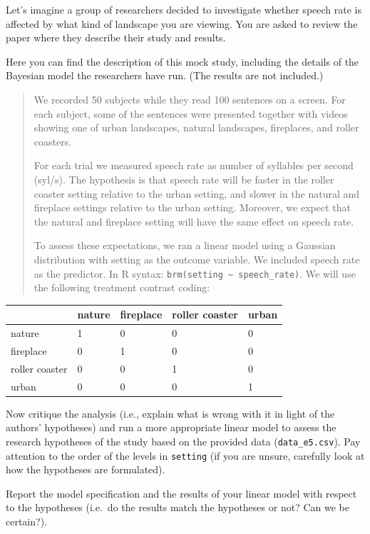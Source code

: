 \documentclass[
]{article}
\begin{document}
Let's imagine a group of researchers decided to investigate whether
speech rate is affected by what kind of landscape you are viewing. You
are asked to review the paper where they describe their study and
results.

Here you can find the description of this mock study, including the
details of the Bayesian model the researchers have run. (The results are
not included.)

\begin{quote}
We recorded 50 subjects while they read 100 sentences on a screen. For
each subject, some of the sentences were presented together with videos
showing one of urban landscapes, natural landscapes, fireplaces, and
roller coasters.

For each trial we measured speech rate as number of syllables per second
(syl/s). The hypothesis is that speech rate will be faster in the roller
coaster setting relative to the urban setting, and slower in the natural
and fireplace settings relative to the urban setting. Moreover, we
expect that the natural and fireplace setting will have the same effect
on speech rate.

To assess these expectations, we ran a linear model using a Gaussian
distribution with setting as the outcome variable. We included speech
rate as the predictor. In R syntax:
\texttt{brm(setting\ \textasciitilde{}\ speech\_rate)}. We will use the
following treatment contrast coding:
\end{quote}

\begin{longtable}[]{@{}lllll@{}}
\toprule\noalign{}
& nature & fireplace & roller coaster & urban \\
\midrule\noalign{}
\endhead
\bottomrule\noalign{}
\endlastfoot
nature & 1 & 0 & 0 & 0 \\
fireplace & 0 & 1 & 0 & 0 \\
roller coaster & 0 & 0 & 1 & 0 \\
urban & 0 & 0 & 0 & 1 \\
\end{longtable}

Now critique the analysis (i.e., explain what is wrong with it in light
of the authors' hypotheses) and run a more appropriate linear model to
assess the research hypotheses of the study based on the provided data
(\texttt{data\_e5.csv}). Pay attention to the order of the levels in
\texttt{setting} (if you are unsure, carefully look at how the
hypotheses are formulated).

Report the model specification and the results of your linear model with
respect to the hypotheses (i.e.~do the results match the hypotheses or
not? Can we be certain?).
\end{document}
